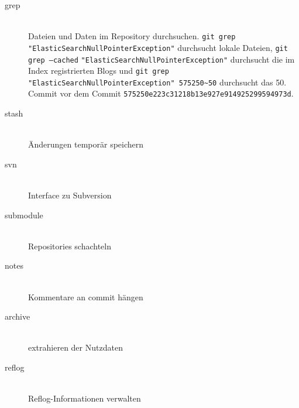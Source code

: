 \documentclass[a4paper, 12pt]{article}
\begin{document}
\begin{description}
  \item[grep] \hfill \\
  Dateien und Daten im Repository durchsuchen. \texttt{git grep} \verb|"|\texttt{ElasticSearchNullPointerException}\verb|"| durchsucht lokale Dateien, \texttt{git grep --cached} \verb|"|\texttt{ElasticSearchNullPointerException}\verb|"| durchsucht die im Index registrierten Blogs und \texttt{git grep }\verb|"|\texttt{ElasticSearchNullPointerException}\verb|"|\texttt{ 575250}\verb|~|\texttt{50} durchsucht das 50. Commit vor dem Commit \texttt{575250e223c31218b13e927e914925299594973d}.
  
  
  \item[stash] \hfill \\
  Änderungen temporär speichern
  \item[svn] \hfill \\
  Interface zu Subversion

  \item[submodule] \hfill \\
	Repositories schachteln
	
  \item[notes] \hfill \\
  Kommentare an commit hängen
  
  \item[archive] \hfill \\
  extrahieren der Nutzdaten
  
  \item[reflog] \hfill \\
  Reflog-Informationen verwalten

  
  
  
\end{description}
\end{document}

